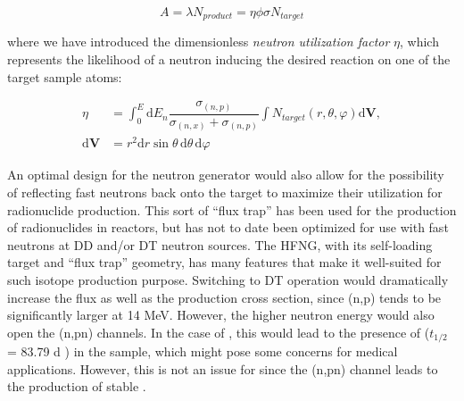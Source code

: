 \documentclass[5p]{elsarticle}
\newcommand{\pp}[1]{\left( #1\right)}
\begin{document}
\begin{equation}
A = \lambda N_{product} = \eta \phi \sigma N_{target}
\end{equation}

where we have introduced the dimensionless \emph{neutron utilization factor} $\eta$, which represents the likelihood of a neutron inducing the desired reaction on one of the target sample atoms:





\begin{align}
\eta &= \int_0^E \text{d}E_n \dfrac{\sigma_{(n,p)}}{\sigma_{(n,x)} + \sigma_{(n,p)}} \int N_{target} \pp{r,\theta,\varphi} \text{d}\mathbf{V}, \nonumber\\
\text{d}\mathbf{V} &= r^2 \text{d}r \sin{\theta}\, \text{d}\theta\, \text{d}\varphi 
\end{align}


An optimal design for the neutron generator would also allow for the possibility of reflecting fast neutrons back onto the target to maximize their utilization for radionuclide production.
 This sort of \enquote{flux trap} has been used for the production of radionuclides in reactors, but has not to date been optimized for use with fast neutrons  at DD and/or DT neutron sources.
 The HFNG, with its self-loading target and \enquote{flux trap} geometry, has many features that make it well-suited for such isotope production purpose.
 Switching to DT operation would dramatically increase the flux as well as the production cross section, since (n,p) tends to be significantly larger at 14 MeV.
 However, the higher neutron energy would also open the (n,pn) channels.
 In the case of , this would lead to the presence of  ($t_{1/2}$ = 83.79 d \cite{Wu2000}) in the sample, which might pose some concerns for medical applications.
 However, this is not an issue for  since the (n,pn) channel leads to the production of stable .
 
\end{document}

